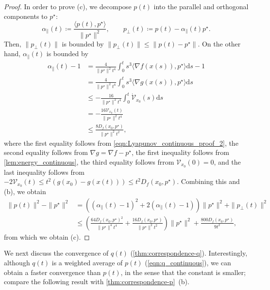 \documentclass[11pt,a4paper]{article}
\theoremstyle{definition}
\theoremstyle{plain}
\newcommand{\rmd}{{\mathrm{d}}}
\begin{document}
\begin{proof}
    In order to prove (c), we decompose $p(t)$ into the parallel and orthogonal components to $p^\star$:
    \[
        \alpha_\parallel(t) \coloneqq \frac{\langle p(t), p^\star\rangle}{\|p^\star\|^2},\qquad p_\perp(t) \coloneqq p(t) - \alpha_\parallel(t)p^\star.
    \]
    Then, $\|p_\perp(t)\|$ is bounded by $\|p_\perp(t)\| \le \|p(t) - p^\star\|$.
    On the other hand, $\alpha_\parallel(t)$ is bounded by
    \begin{align*}
        \alpha_\parallel(t) - 1
        &= \frac{4}{\|p^\star\|^2t^4}\int_0^ts^3\langle\nabla f(x(s)), p^\star\rangle\rmd s - 1\\
        &= \frac{4}{\|p^\star\|^2t^4}\int_0^ts^3\langle\nabla g(x(s)), p^\star\rangle\rmd s\\
        &\le -\frac{16}{\|p^\star\|^2t^4}\int_0^t\dot{\mathcal{V}}_{x_0}(s)\rmd s\\
        &= -\frac{16\mathcal{V}_{x_0}(t)}{\|p^\star\|^2t^4}\\
        &\le \frac{8D_f(x_0, p^\star)}{\|p^\star\|^2t^2},
    \end{align*}
    where the first equality follows from \eqref{eqn:Lyapunov_continuous_proof_2}, the second equality follows from $\nabla g = \nabla f - p^\star$, the first inequality follows from \cref{lem:energy_continuous}, the third equality follows frrom $ \mathcal{V}_{x_0}(0) = 0$, and the last inequality follows from $-2\mathcal{V}_{x_0}(t) \le t^2(g(x_0) - g(x(t))) \le t^2D_f(x_0, p^\star)$.
    Combining this and (b), we obtain
    \begin{align*}
        \|p(t)\|^2 - \|p^\star\|^2
        &= \left(\left(\alpha_\parallel(t) - 1\right)^2 + 2\left(\alpha_\parallel(t) - 1\right)\right)\|p^\star\|^2 + \|p_\perp(t)\|^2\\
        &\le \left(\frac{64D_f(x_0, p^\star)^2}{\|p^\star\|^4t^4} + \frac{16D_f(x_0, p^\star)}{\|p^\star\|^2t^2}\right)\|p^\star\|^2 + \frac{800D_f(x_0, p^\star)}{9t^2},
    \end{align*}
    from which we obtain (c).
\end{proof}

We next discuss the convergence of $q(t)$ (\cref{thm:correspondence-q}).
Interestingly, although $q(t)$ is a weighted average of $p(t)$ (\cref{eqn:q_continuous}), we can obtain a faster convergence than $p(t)$, in the sense that the constant is smaller; compare the following result with \cref{thm:correspondence-p}~(b).
\end{document}
